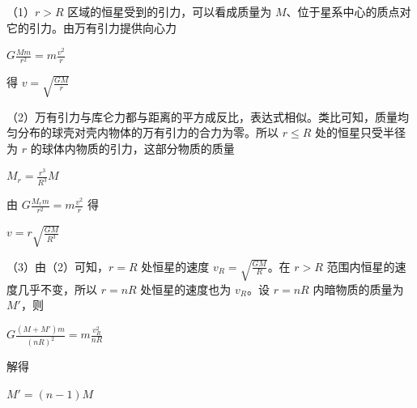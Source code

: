 \documentclass[\gkver]{gaokaozhenti}
\begin{document}
\begin{enumerate}
{（1）$r > R$ 区域的恒星受到的引力，可以看成质量为 $M$、位于星系中心的质点对它的引力。由万有引力提供向心力

$G\frac{Mm}{r^{2}} = m\frac{v^{2}}{r}$

得 $v = \sqrt{\frac{GM}{r}}$

（2）万有引力与库仑力都与距离的平方成反比，表达式相似。类比可知，质量均匀分布的球壳对壳内物体的万有引力的合力为零。所以 $r \leq R$ 处的恒星只受半径为 $r$ 的球体内物质的引力，这部分物质的质量

$M_{r} = \frac{r^{3}}{R^{3}}M$

由 $G\frac{M_{r}m}{r^{2}} = m\frac{v^{2}}{r}$ 得

$v = r\sqrt{\frac{GM}{R^{3}}}$

（3）由（2）可知，$r = R$ 处恒星的速度 $v_{R} = \sqrt{\frac{GM}{R}}$。在 $r > R$ 范围内恒星的速度几乎不变，所以 $r = nR$ 处恒星的速度也为 $v_{R}$。设 $r = nR$ 内暗物质的质量为 $M'$，则

$G\frac{(M + M')m}{(nR)^{2}} = m\frac{v_{R}^{2}}{nR}$

解得

$M' = (n - 1)M$
}

\end{enumerate}
\end{document}
